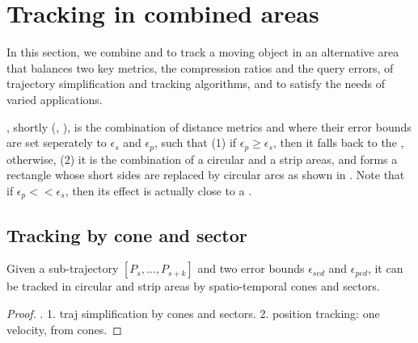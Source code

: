 

\section{Tracking in combined areas}
\label{sec:combine}

In this section, we combine \sed and \ped to track a moving object in an alternative area that balances two key metrics, \ie the compression ratios and the query errors, of trajectory simplification and tracking algorithms, and to satisfy the needs of varied applications.


, shortly \bed (\sed, \ped), is the combination of distance metrics \sed and \ped where their error bounds are set seperately to $\epsilon_s$ and $\epsilon_p$, such that (1) if $\epsilon_p \ge \epsilon_s$, then it falls back to the \sed, otherwise, (2) it is the combination of a circular and a strip areas, and forms a rectangle whose short sides are replaced by circular arcs as shown in . Note that if $\epsilon_p << \epsilon_s$, then its effect is actually close to a \ped.



\subsection{Tracking by cone and sector}

\begin{theorem}
	\label{theo-full-sector}
	Given a sub-trajectory $[P_s,...,P_{s+k}]$ and two error bounds $\epsilon_{sed}$ and $\epsilon_{ped}$, it can be tracked in circular and strip areas by spatio-temporal cones and sectors.
\end{theorem}

\begin{proof}
	\todo.
	1. traj simplification by cones and sectors.
	2. position tracking: one velocity, from cones.
\end{proof}


